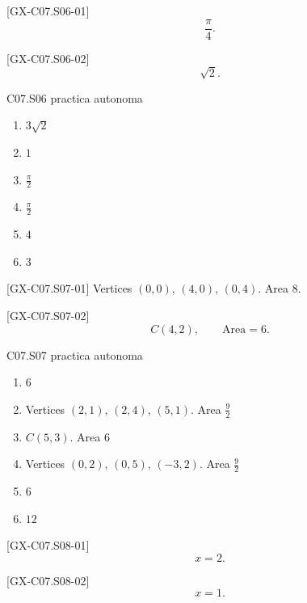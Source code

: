 \begin{shortanswer}{[GX-C07.S06-01]}
\[
\frac{\pi}{4}.
\]
\end{shortanswer}

\begin{shortanswer}{[GX-C07.S06-02]}
\[
\sqrt{2}.
\]
\end{shortanswer}

\begin{shortanswer}{C07.S06 practica autonoma}
\begin{enumerate}[label=\textbf{PX-C07.S06-\arabic*:}, leftmargin=*]
  \item \(3\sqrt{2}\)
  \item \(1\)
  \item \(\frac{\pi}{2}\)
  \item \(\frac{\pi}{2}\)
  \item \(4\)
  \item \(3\)
\end{enumerate}
\end{shortanswer}

\begin{shortanswer}{[GX-C07.S07-01]}
Vertices \((0,0)\), \((4,0)\), \((0,4)\). Area \(8\).
\end{shortanswer}

\begin{shortanswer}{[GX-C07.S07-02]}
\[
C(4,2),
\qquad
\text{Area}=6.
\]
\end{shortanswer}

\begin{shortanswer}{C07.S07 practica autonoma}
\begin{enumerate}[label=\textbf{PX-C07.S07-\arabic*:}, leftmargin=*]
  \item \(6\)
  \item Vertices \((2,1)\), \((2,4)\), \((5,1)\). Area \(\frac{9}{2}\)
  \item \(C(5,3)\). Area \(6\)
  \item Vertices \((0,2)\), \((0,5)\), \((-3,2)\). Area \(\frac{9}{2}\)
  \item \(6\)
  \item \(12\)
\end{enumerate}
\end{shortanswer}

\begin{shortanswer}{[GX-C07.S08-01]}
\[
x=2.
\]
\end{shortanswer}

\begin{shortanswer}{[GX-C07.S08-02]}
\[
x=1.
\]
\end{shortanswer}

